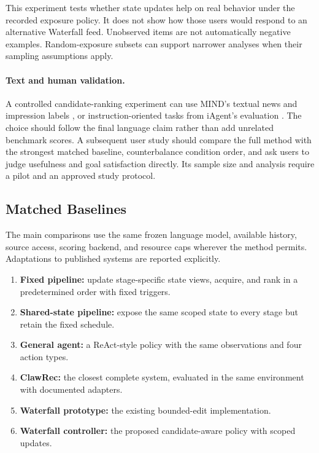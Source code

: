 \documentclass[11pt]{article}
\begin{document}
This experiment tests whether state updates help on real behavior under the recorded exposure policy. It does not show how those users would respond to an alternative Waterfall feed. Unobserved items are not automatically negative examples. Random-exposure subsets can support narrower analyses when their sampling assumptions apply.

\paragraph{Text and human validation.}
A controlled candidate-ranking experiment can use MIND's textual news and impression labels \citep{wu2020mind}, or instruction-oriented tasks from iAgent's evaluation \citep{xu-etal-2025-iagent}. The choice should follow the final language claim rather than add unrelated benchmark scores. A subsequent user study should compare the full method with the strongest matched baseline, counterbalance condition order, and ask users to judge usefulness and goal satisfaction directly. Its sample size and analysis require a pilot and an approved study protocol.

\subsection{Matched Baselines}

The main comparisons use the same frozen language model, available history, source access, scoring backend, and resource caps wherever the method permits. Adaptations to published systems are reported explicitly.

\begin{enumerate}
    \item \textbf{Fixed pipeline:} update stage-specific state views, acquire, and rank in a predetermined order with fixed triggers.
    \item \textbf{Shared-state pipeline:} expose the same scoped state to every stage but retain the fixed schedule.
    \item \textbf{General agent:} a ReAct-style policy with the same observations and four action types.
    \item \textbf{ClawRec:} the closest complete system, evaluated in the same environment with documented adapters.
    \item \textbf{Waterfall prototype:} the existing bounded-edit implementation.
    \item \textbf{Waterfall controller:} the proposed candidate-aware policy with scoped updates.
\end{enumerate}
\end{document}
